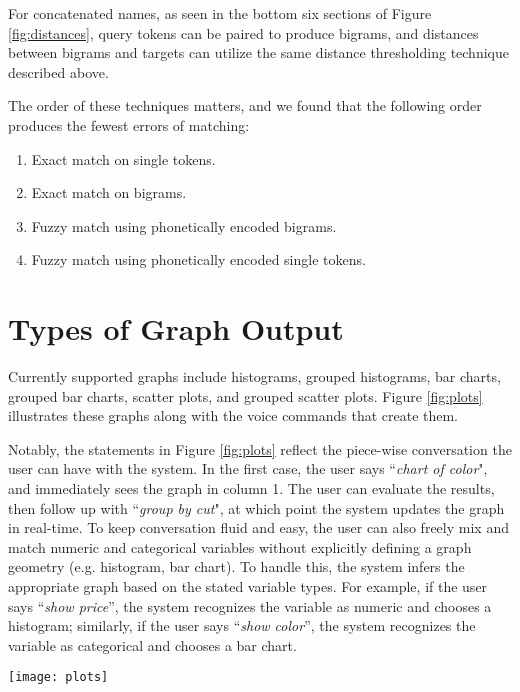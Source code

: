 \documentclass[11pt]{article}
\begin{document}
For concatenated names, as seen in the bottom six sections of Figure \ref{fig:distances}, query tokens can be paired to produce bigrams, and distances between bigrams and targets can utilize the same distance thresholding technique described above.

The order of these techniques matters, and we found that the following order produces the fewest errors of matching:
\begin{enumerate}
\item Exact match on single tokens.
\item Exact match on bigrams.
\item Fuzzy match using phonetically encoded bigrams.
\item Fuzzy match using phonetically encoded single tokens.
\end{enumerate}

\section{Types of Graph Output}
Currently supported graphs include histograms, grouped histograms, bar charts, grouped bar charts, scatter plots, and grouped scatter plots. Figure \ref{fig:plots} illustrates these graphs along with the voice commands that create them.

Notably, the statements in Figure \ref{fig:plots} reflect the piece-wise conversation the user can have with the system. In the first case, the user says ``\textit{chart of color}", and immediately sees the graph in column 1. The user can evaluate the results, then follow up with ``\textit{group by cut}", at which point the system updates the graph in real-time. To keep conversation fluid and easy, the user can also freely mix and match numeric and categorical variables without explicitly defining a graph geometry (e.g. histogram, bar chart). To handle this, the system infers the appropriate graph based on the stated variable types.  For example, if the user says ``\textit{show price}'', the system recognizes the variable as numeric and chooses a histogram; similarly, if the user says ``\textit{show color}'', the system recognizes the variable as categorical and chooses a bar chart.

\begin{figure*}
\texttt{[image: plots]}
\caption{Plots are created using sequential commands, and can involve groupings by categorical or numerical variables. If no graph type is stated, the system infers the graph geometry based on variable types. For invalid graphs, the system indicates why and awaits another graph command.}
\label{fig:plots}
\end{figure*}
\end{document}
